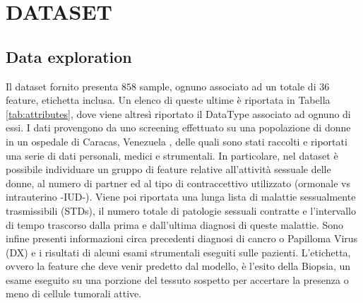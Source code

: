 \section{DATASET}
\subsection{Data exploration}
Il dataset fornito presenta $858$ sample, ognuno associato ad un totale di $36$ feature, etichetta inclusa. Un elenco di queste ultime è riportata in Tabella \ref{tab:attributes}, dove viene altresì riportato il DataType associato ad ognuno di essi. I dati provengono da uno screening effettuato su una popolazione di donne in un ospedale di Caracas, Venezuela \cite{ML}, delle quali sono stati raccolti e riportati una serie di dati personali, medici e strumentali. In particolare, nel dataset è possibile individuare un gruppo di feature relative all'attività sessuale delle donne, al numero di partner ed al tipo di contraccettivo utilizzato (ormonale vs intrauterino -IUD-). Viene poi riportata una lunga lista di malattie sessualmente trasmissibili (STDs), il numero totale di patologie sessuali contratte e l'intervallo di tempo trascorso dalla prima e dall'ultima diagnosi di queste malattie. Sono infine presenti informazioni circa precedenti diagnosi di cancro o Papilloma Virus (DX) e i risultati di alcuni esami strumentali eseguiti sulle pazienti. L'etichetta, ovvero la feature che deve venir predetto dal modello, è l'esito della Biopsia, un esame eseguito su una porzione del tessuto sospetto per accertare la presenza o meno di cellule tumorali attive. 
